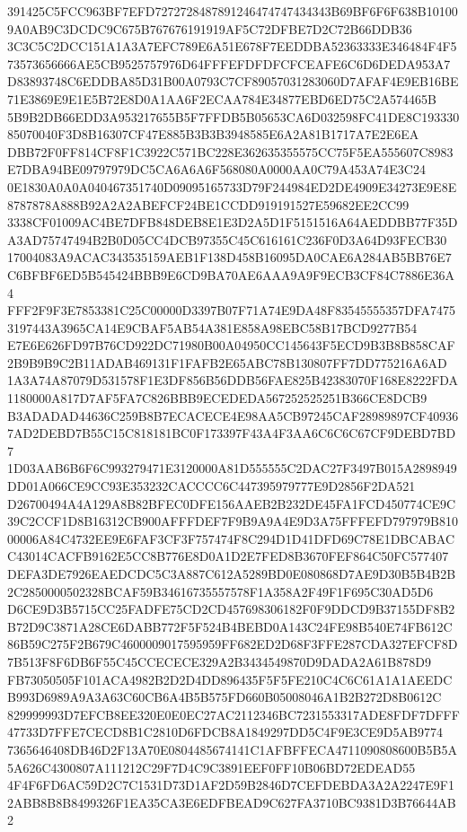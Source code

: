 \documentclass[UTF8,fontset=fandol,zihao=-4,a4paper]{ctexart}
\begin{document}
{{391425C5FCC963BF7EFD7272728487891246474747434343B69BF6F6F638B101009A0AB9C3DCDC9C675B767676191919AF5C72DFBE7D2C72B66DDB36
3C3C5C2DCC151A1A3A7EFC789E6A51E678F7EEDDBA52363333E346484F4F573573656666AE5CB9525757976D64FFFEFDFDFCFCEAFE6C6D6DEDA953A7
D83893748C6EDDBA85D31B00A0793C7CF89057031283060D7AFAF4E9EB16BE71E3869E9E1E5B72E8D0A1AA6F2ECAA784E34877EBD6ED75C2A574465B
5B9B2DB66EDD3A953217655B5F7FFDB5B05653CA6D032598FC41DE8C19333085070040F3D8B16307CF47E885B3B3B3948585E6A2A81B1717A7E2E6EA
DBB72F0FF814CF8F1C3922C571BC228E362635355575CC75F5EA555607C8983E7DBA94BE09797979DC5CA6A6A6F568080A0000AA0C79A453A74E3C24
0E1830A0A0A040467351740D09095165733D79F244984ED2DE4909E34273E9E8E8787878A888B92A2A2ABEFCF24BE1CCDD919191527E59682EE2CC99
3338CF01009AC4BE7DFB848DEB8E1E3D2A5D1F5151516A64AEDDBB77F35DA3AD75747494B2B0D05CC4DCB97355C45C616161C236F0D3A64D93FECB30
17004083A9ACAC343535159AEB1F138D458B16095DA0CAE6A284AB5BB76E7C6BFBF6ED5B545424BBB9E6CD9BA70AE6AAA9A9F9ECB3CF84C7886E36A4
FFF2F9F3E7853381C25C00000D3397B07F71A74E9DA48F83545555357DFA74753197443A3965CA14E9CBAF5AB54A381E858A98EBC58B17BCD9277B54
E7E6E626FD97B76CD922DC71980B00A04950CC145643F5ECD9B3B8B858CAF2B9B9B9C2B11ADAB469131F1FAFB2E65ABC78B130807FF7DD775216A6AD
1A3A74A87079D531578F1E3DF856B56DDB56FAE825B42383070F168E8222FDA1180000A817D7AF5FA7C826BBB9ECEDEDA567252525251B366CE8DCB9
B3ADADAD44636C259B8B7ECACECE4E98AA5CB97245CAF28989897CF409367AD2DEBD7B55C15C818181BC0F173397F43A4F3AA6C6C6C67CF9DEBD7BD7
1D03AAB6B6F6C993279471E3120000A81D555555C2DAC27F3497B015A2898949DD01A066CE9CC93E353232CACCCC6C447395979777E9D2856F2DA521
D26700494A4A129A8B82BFEC0DFE156AAEB2B232DE45FA1FCD450774CE9C39C2CCF1D8B16312CB900AFFFDEF7F9B9A9A4E9D3A75FFFEFD797979B810
00006A84C4732EE9E6FAF3CF3F757474F8C294D1D41DFD69C78E1DBCABACC43014CACFB9162E5CC8B776E8D0A1D2E7FED8B3670FEF864C50FC577407
DEFA3DE7926EAEDCDC5C3A887C612A5289BD0E080868D7AE9D30B5B4B2B2C2850000502328BCAF59B34616735557578F1A358A2F49F1F695C30AD5D6
D6CE9D3B5715CC25FADFE75CD2CD457698306182F0F9DDCD9B37155DF8B2B72D9C3871A28CE6DABB772F5F524B4BEBD0A143C24FE98B540E74FB612C
86B59C275F2B679C4600009017595959FF682ED2D68F3FFE287CDA327EFCF8D7B513F8F6DB6F55C45CCECECE329A2B3434549870D9DADA2A61B878D9
FB73050505F101ACA4982B2D2D4DD896435F5F5FE210C4C6C61A1A1AEEDCB993D6989A9A3A63C60CB6A4B5B575FD660B05008046A1B2B272D8B0612C
829999993D7EFCB8EE320E0E0EC27AC2112346BC7231553317ADE8FDF7DFFF47733D7FFE7CECD8B1C2810D6FDCB8A1849297DD5C4F9E3CE9D5AB9774
7365646408DB46D2F13A70E0804485674141C1AFBFFECA4711090808600B5B5A5A626C4300807A111212C29F7D4C9C3891EEF0FF10B06BD72EDEAD55
4F4F6FD6AC59D2C7C1531D73D1AF2D59B2846D7CEFDEBDA3A2A2247E9F12ABB8B8B8499326F1EA35CA3E6EDFBEAD9C627FA3710BC9381D3B76644AB2
}}
\end{document}
